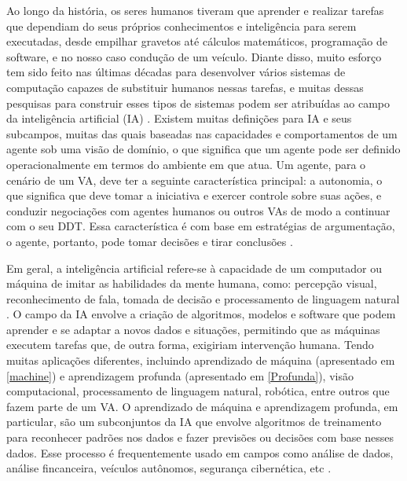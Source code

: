 Ao longo da história, os seres humanos tiveram que aprender e realizar tarefas que dependiam do seus próprios conhecimentos e inteligência para serem executadas, desde empilhar gravetos até cálculos matemáticos, programação de software, e no nosso caso condução de um veículo. Diante disso, muito esforço tem sido feito nas últimas décadas para desenvolver vários sistemas de computação capazes de substituir humanos nessas tarefas, e muitas dessas pesquisas para construir esses tipos de sistemas podem ser atribuídas ao campo da inteligência artificial (IA) \cite{caio}. 
Existem muitas definições para IA e seus subcampos, muitas das quais baseadas nas capacidades e comportamentos de um agente sob uma visão de domínio, o que significa que um agente pode ser definido operacionalmente em termos do ambiente em que atua.
Um agente, para o cenário de um VA, deve ter a seguinte característica principal: a autonomia, o que significa que deve tomar a iniciativa e exercer controle sobre suas ações, e conduzir negociações com agentes humanos ou outros VAs de modo a continuar com o seu DDT.
Essa característica é com base em estratégias de argumentação, o agente, portanto, pode tomar decisões e tirar conclusões \cite{software-ia}. 

Em geral, a inteligência artificial refere-se à capacidade de um computador ou máquina de imitar as habilidades da mente humana, como: percepção visual, reconhecimento de fala, tomada de decisão e processamento de linguagem natural \cite{software-ia}. O campo da IA envolve a criação de algoritmos, modelos e software que podem aprender e se adaptar a novos dados e situações, permitindo que as máquinas executem tarefas que, de outra forma, exigiriam intervenção humana. Tendo muitas aplicações diferentes, incluindo aprendizado de máquina (apresentado em \ref{machine}) e aprendizagem profunda (apresentado em \ref{Profunda}), visão computacional, processamento de linguagem natural, robótica, entre outros que fazem parte de um VA. O aprendizado de máquina e aprendizagem profunda, em particular, são um subconjuntos da IA que envolve algoritmos de treinamento para reconhecer padrões nos dados e fazer previsões ou decisões com base nesses dados. Esse processo é frequentemente usado em campos como análise de dados, análise fincanceira, veículos autônomos, segurança cibernética, etc \cite{software-review, software-cnn}.


 \label{machine}

